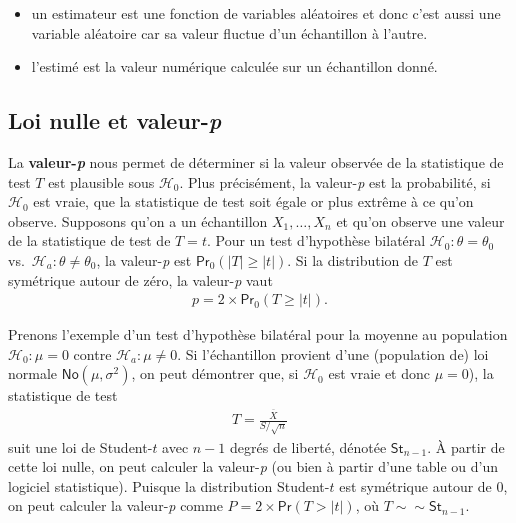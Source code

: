 \documentclass[
  11pt,
  letterpaper,
]{book}
\providecommand{\tightlist}{%
  \setlength{\itemsep}{0pt}\setlength{\parskip}{0pt}}
\theoremstyle{definition}
\theoremstyle{definition}
\theoremstyle{definition}
\theoremstyle{remark}
\begin{document}
\begin{itemize}
\tightlist
\item
  un estimateur est une fonction de variables aléatoires et donc c'est aussi une variable aléatoire car sa valeur fluctue d'un échantillon à l'autre.
\item
  l'estimé est la valeur numérique calculée sur un échantillon donné.
\end{itemize}

\hypertarget{loi-nulle-et-valeur-p}{%
\subsection{\texorpdfstring{Loi nulle et valeur-\emph{p}}{Loi nulle et valeur-p}}\label{loi-nulle-et-valeur-p}}

La \textbf{valeur-\emph{p}} nous permet de déterminer si la valeur observée de la statistique de test \(T\) est plausible sous \(\mathscr{H}_0\). Plus précisément, la valeur-\emph{p} est la probabilité, si \(\mathscr{H}_0\) est vraie, que la statistique de test soit égale or plus extrême à ce qu'on observe. Supposons qu'on a un échantillon \(X_1, \ldots, X_n\) et qu'on observe une valeur de la statistique de test de \(T=t\). Pour un test d'hypothèse bilatéral \(\mathscr{H}_0:\theta=\theta_0\) vs.~\(\mathscr{H}_a:\theta \neq \theta_0\), la valeur-\emph{p} est
\(\mathsf{Pr}_0(|T| \geq |t|)\). Si la distribution de \(T\) est symétrique autour de zéro, la valeur-\emph{p} vaut
\begin{align*}
p = 2 \times \mathsf{Pr}_0(T \geq |t|).
\end{align*}

Prenons l'exemple d'un test d'hypothèse bilatéral pour la moyenne au population \(\mathscr{H}_0:\mu=0\) contre \(\mathscr{H}_a:\mu \neq 0\). Si l'échantillon provient d'une (population de) loi normale \(\mathsf{No}(\mu, \sigma^2)\), on peut démontrer que, si \(\mathscr{H}_0\) est vraie et donc \(\mu=0\)), la statistique de test
\begin{align*}
T = \frac{\overline{X}}{S/\sqrt{n}}
\end{align*}
suit une loi de Student-\(t\) avec \(n-1\) degrés de liberté, dénotée \(\mathsf{St}_{n-1}\). À partir de cette loi nulle, on peut calculer la valeur-\emph{p} (ou bien à partir d'une table ou d'un logiciel statistique). Puisque la distribution Student-\(t\) est symétrique autour de \(0\), on peut calculer la valeur-\emph{p} comme \(P = 2\times\mathsf{Pr}(T > |t|)\), où \(T \sim \sim \mathsf{St}_{n-1}\).
\end{document}
